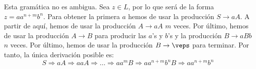 \begin{ejercicio}
\begin{enumerate}
        Esta gramática no es ambigua. Sea $z\in L$, por lo que será de la forma $z=aa^{n+m}b^n$. Para obtener la primera $a$ hemos de usar la producción $S\rightarrow aA$. A partir de aquí, hemos de usar la producción $A\rightarrow aA$ $m$ veces. Por último, hemos de usar la producción $A\rightarrow B$ para producir las $a$'s y $b$'s y la producción $B\rightarrow aBb$ $n$ veces. Por último, hemos de usar la producción $B\rightarrow \veps$ para terminar. Por tanto, la única derivación posible es:
        \begin{equation*}
            S\Rightarrow aA\Rightarrow aaA\Rightarrow \ldots \Rightarrow aa^{m}B\Rightarrow aa^{n+m}b^nB \Rightarrow aa^{n+m}b^n
        \end{equation*}
    \end{enumerate}
\end{ejercicio}

